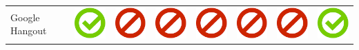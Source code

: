 \documentclass[10pt,foldmark,tumble]{leaflet}
\begin{document}
\begin{center}
{{\begin{tabular}{ L{2cm} | C{2cm} | C{2cm} | C{2cm} | C{2cm} | C{2cm} | C{2cm} | C{2cm} }
Google Hangout & \includegraphics[scale=0.1]{pics/haken.png} & \includegraphics[scale=0.1]{pics/nohaken.png} & \includegraphics[scale=0.1]{pics/nohaken.png} & \includegraphics[scale=0.1]{pics/nohaken.png} & \includegraphics[scale=0.1]{pics/nohaken.png} & \includegraphics[scale=0.1]{pics/nohaken.png} & \includegraphics[scale=0.1]{pics/haken.png} \tabularnewline

\end{tabular}}}
\end{center}
\end{document}
